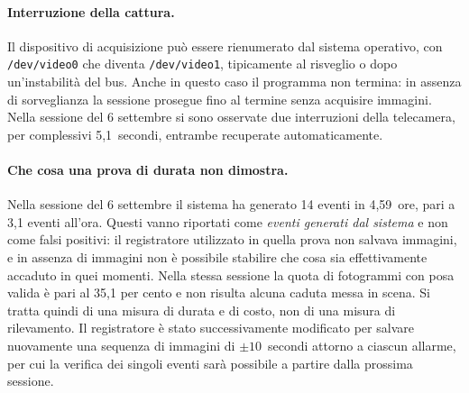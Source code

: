 \paragraph{Interruzione della cattura.}

Il dispositivo di acquisizione può essere rienumerato dal sistema operativo, con \texttt{/dev/video0} che diventa \texttt{/dev/video1}, tipicamente al risveglio o dopo un'instabilità del bus. Anche in questo caso il programma non termina: in assenza di sorveglianza la sessione prosegue fino al termine senza acquisire immagini. Nella sessione del 6 settembre si sono osservate due interruzioni della telecamera, per complessivi 5,1~secondi, entrambe recuperate automaticamente.

\paragraph{Che cosa una prova di durata non dimostra.}

Nella sessione del 6 settembre il sistema ha generato 14 eventi in 4,59~ore, pari a 3,1 eventi all'ora. Questi vanno riportati come \emph{eventi generati dal sistema} e non come falsi positivi: il registratore utilizzato in quella prova non salvava immagini, e in assenza di immagini non è possibile stabilire che cosa sia effettivamente accaduto in quei momenti. Nella stessa sessione la quota di fotogrammi con posa valida è pari al 35,1 per cento e non risulta alcuna caduta messa in scena. Si tratta quindi di una misura di durata e di costo, non di una misura di rilevamento. Il registratore è stato successivamente modificato per salvare nuovamente una sequenza di immagini di $\pm 10$~secondi attorno a ciascun allarme, per cui la verifica dei singoli eventi sarà possibile a partire dalla prossima sessione.

